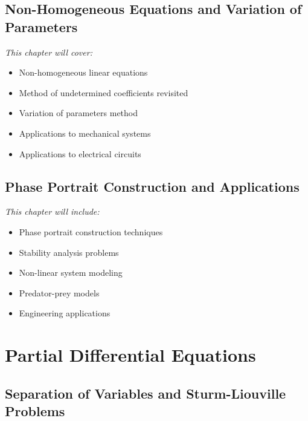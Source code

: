 \documentclass[12pt, letterpaper]{book}
\begin{document}
\chapter{Non-Homogeneous Equations and Variation of Parameters}
\label{chap:session_15}

\textit{This chapter will cover:}
\begin{itemize}
    \item Non-homogeneous linear equations
    \item Method of undetermined coefficients revisited
    \item Variation of parameters method
    \item Applications to mechanical systems
    \item Applications to electrical circuits
\end{itemize}

\chapter{Phase Portrait Construction and Applications}
\label{chap:session_16}

\textit{This chapter will include:}
\begin{itemize}
    \item Phase portrait construction techniques
    \item Stability analysis problems
    \item Non-linear system modeling
    \item Predator-prey models
    \item Engineering applications
\end{itemize}

\part{Partial Differential Equations}
\label{part:partial_de}

\chapter{Separation of Variables and Sturm-Liouville Problems}
\label{chap:session_17}
\end{document}
